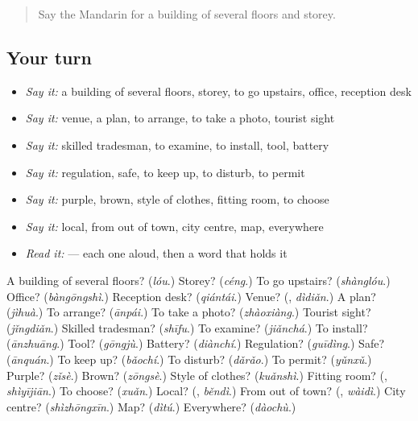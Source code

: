 \label{lesson:ZH-R211-review-206-211}



\begin{quote}
Say the Mandarin for a building of several floors and storey.
\end{quote}

\subsection*{Your turn}
\begin{itemize}
\raggedright
  \item \emph{Say it:} a building of several floors, storey, to go upstairs, office, reception desk
  \item \emph{Say it:} venue, a plan, to arrange, to take a photo, tourist sight
  \item \emph{Say it:} skilled tradesman, to examine, to install, tool, battery
  \item \emph{Say it:} regulation, safe, to keep up, to disturb, to permit
  \item \emph{Say it:} purple, brown, style of clothes, fitting room, to choose
  \item \emph{Say it:} local, from out of town, city centre, map, everywhere
  \item \emph{Read it:}  — each one aloud, then a word that holds it
\end{itemize}

\begin{tcolorbox}[breakable,colback=teal!4,colframe=teal!35!black,title={Before you move on}]
A building of several floors? (\emph{lóu}.) Storey? (\emph{céng}.) To go upstairs? (\emph{shànglóu}.) Office? (\emph{bàngōngshì}.) Reception desk? (\emph{qiántái}.) Venue? (\textbf{}, \emph{dìdiǎn}.) A plan? (\emph{jìhuà}.) To arrange? (\emph{ānpái}.) To take a photo? (\emph{zhàoxiàng}.) Tourist sight? (\emph{jǐngdiǎn}.) Skilled tradesman? (\emph{shīfu}.) To examine? (\emph{jiǎnchá}.) To install? (\emph{ānzhuāng}.) Tool? (\emph{gōngjù}.) Battery? (\emph{diànchí}.) Regulation? (\emph{guīdìng}.) Safe? (\emph{ānquán}.) To keep up? (\emph{bǎochí}.) To disturb? (\emph{dǎrǎo}.) To permit? (\emph{yǔnxǔ}.) Purple? (\emph{zǐsè}.) Brown? (\emph{zōngsè}.) Style of clothes? (\emph{kuǎnshì}.) Fitting room? (\textbf{}, \emph{shìyījiān}.) To choose? (\emph{xuǎn}.) Local? (\textbf{}, \emph{běndì}.) From out of town? (\textbf{}, \emph{wàidì}.) City centre? (\emph{shìzhōngxīn}.) Map? (\emph{dìtú}.) Everywhere? (\emph{dàochù}.)
\end{tcolorbox}
